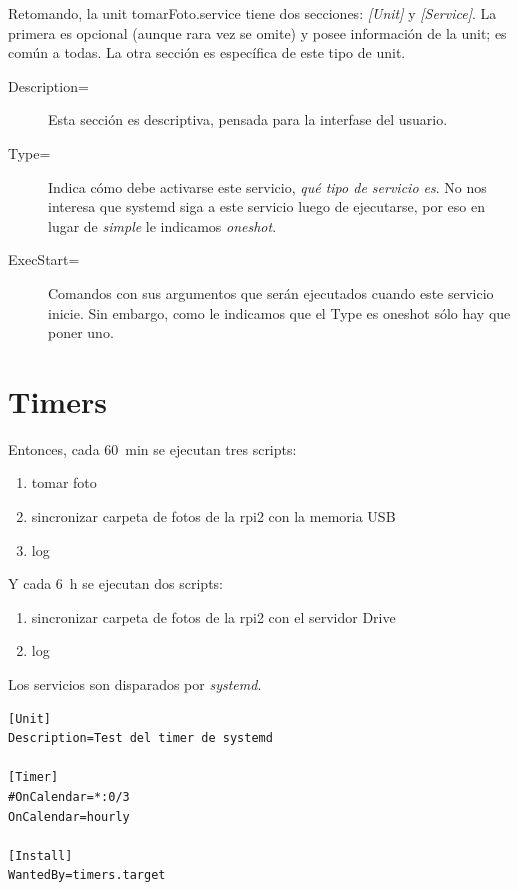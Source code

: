 \documentclass[10pt,a4paper]{article}
\begin{document}
Retomando, la unit tomarFoto.service tiene dos secciones: \emph{[Unit]} y \emph{[Service]}. La primera es opcional (aunque rara vez se omite) y posee informaci\'on de la unit; es com\'un a todas. La otra secci\'on es espec\'ifica de este tipo de unit. 

\begin{description}
    \item [Description=] Esta secci\'on es descriptiva, pensada para la interfase del usuario.
    \item [Type=] Indica c\'omo debe activarse este servicio, \emph{qu\'e tipo de servicio es}. No nos interesa que systemd siga a este servicio luego de ejecutarse, por eso en lugar de \emph{simple} le indicamos \emph{oneshot}.
    \item [ExecStart=] Comandos con sus argumentos que ser\'an ejecutados cuando este servicio inicie. Sin embargo, como le indicamos que el Type es oneshot s\'olo hay que poner uno. 
\end{description}

\section{Timers}

Entonces, cada \SI{60}{min} se ejecutan tres scripts:
\begin{enumerate}
    \item tomar foto
    \item sincronizar carpeta de fotos de la rpi2 con la memoria USB
    \item log
\end{enumerate}

Y cada \SI{6}{h} se ejecutan dos scripts:
\begin{enumerate}
    \item sincronizar carpeta de fotos de la rpi2 con el servidor Drive
    \item log
\end{enumerate}

Los servicios son disparados por \emph{systemd}.

\begin{scriptsize}
\begin{mdframed}
\begin{verbatim}
[Unit]
Description=Test del timer de systemd

[Timer]
#OnCalendar=*:0/3
OnCalendar=hourly

[Install]
WantedBy=timers.target
\end{verbatim}
\end{mdframed}
\end{scriptsize}
\end{document}
